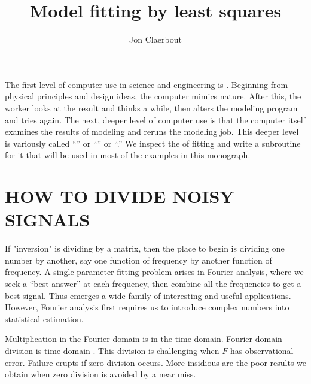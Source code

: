 
\title{Model fitting by least squares}
\author{Jon Claerbout}

\maketitle

\label{paper:lsq}

\def\ff{{\bf f}}
\def\dd{{\bf d}}

\par
The first level of computer use in science and engineering is .
Beginning from physical principles and design ideas,
the computer mimics nature.
After this, the worker looks at the result and thinks a while,
then alters the modeling program and tries again.
The next, deeper level of computer use is that the computer itself
examines the results of modeling and reruns the modeling job.
This deeper level
is variously called
``'' or
``'' or
``.''
We inspect the  of fitting
and write a subroutine for it that will be used in most of
the examples in this monograph.

\section{HOW TO DIVIDE NOISY SIGNALS}
If "inversion" is dividing by a matrix,
then the place to begin is dividing one number by another,
say one function of frequency by another function of frequency.
A single parameter fitting problem arises in Fourier analysis,
where we seek a ``best answer'' at each frequency,
then combine all the frequencies to get a best signal.
Thus emerges a wide family of interesting and useful applications.
However, Fourier analysis first requires us to introduce complex numbers
into statistical estimation.
\par
Multiplication in the Fourier domain is  in the time domain.
Fourier-domain division is time-domain .
This division is challenging when $F$ has observational error.
Failure erupts if zero division occurs.
More insidious are the poor results we obtain
when zero division is avoided by a near miss.

